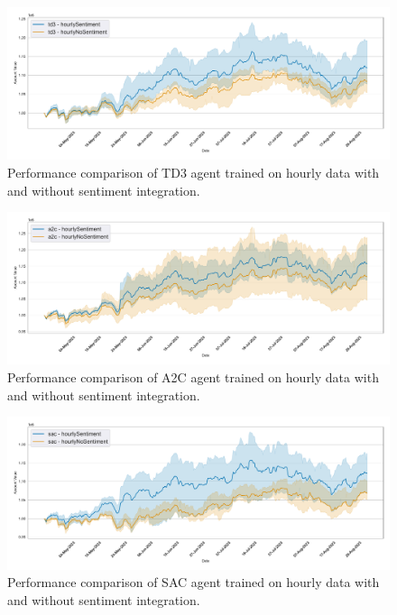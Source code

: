 \documentclass[12pt]{article}
\begin{document}
\begin{figure}[h]
\centering
\includegraphics[width=1\textwidth]{figs/Models_comparison/Sentiment/Compare_agent_performance_hourlySentiment_td3.pdf}
\caption{Performance comparison of TD3 agent trained on hourly data with and without sentiment integration.}
\label{fig:Compare_agent_performance_hourlySentiment_td3}
\end{figure}

\begin{figure}[h]
\centering
\includegraphics[width=1\textwidth]{figs/Models_comparison/Sentiment/Compare_agent_performance_hourlySentiment_a2c.pdf}
\caption{Performance comparison of A2C agent trained on hourly data with and without sentiment integration.}
\label{fig:Compare_agent_performance_hourlySentiment_a2c}
\end{figure}

\begin{figure}[h]
\centering
\includegraphics[width=1\textwidth]{figs/Models_comparison/Sentiment/Compare_agent_performance_hourlySentiment_sac.pdf}
\caption{Performance comparison of SAC agent trained on hourly data with and without sentiment integration.}
\label{fig:Compare_agent_performance_hourlySentiment_sac}
\end{figure}
\end{document}
